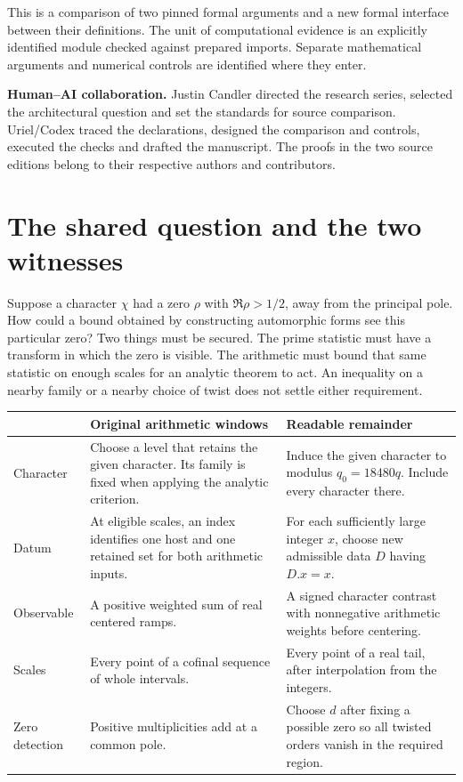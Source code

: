 \documentclass[12pt,letterpaper]{article}
\begin{document}
This is a comparison of two pinned formal arguments and a new formal interface between their definitions. The unit of computational evidence is an explicitly identified module checked against prepared imports. Separate mathematical arguments and numerical controls are identified where they enter.
\medskip

\textbf{Human--AI collaboration.} Justin Candler directed the research series, selected the architectural question and set the standards for source comparison. Uriel/Codex traced the declarations, designed the comparison and controls, executed the checks and drafted the manuscript. The proofs in the two source editions belong to their respective authors and contributors.
\clearpage\begingroup\small\setlength{\parskip}{0pt}\tableofcontents\endgroup
\clearpage{}

\section{The shared question and the two witnesses}
Suppose a character $\chi$ had a zero $\rho$ with $\Re\rho>1/2$, away from the principal pole. How could a bound obtained by constructing automorphic forms see this particular zero? Two things must be secured. The prime statistic must have a transform in which the zero is visible. The arithmetic must bound that same statistic on enough scales for an analytic theorem to act. An inequality on a nearby family or a nearby choice of twist does not settle either requirement.

\begin{center}\small
\begin{tabularx}{\linewidth}{@{}p{.17\linewidth}YY@{}}\toprule
 & Original arithmetic windows & Readable remainder\\\midrule
Character & Choose a level that retains the given character. Its family is fixed when applying the analytic criterion. & Induce the given character to modulus $q_0=18480q$. Include every character there.\\
Datum & At eligible scales, an index identifies one host and one retained set for both arithmetic inputs. & For each sufficiently large integer $x$, choose new admissible data $D$ having $D.x=x$.\\
Observable & A positive weighted sum of real centered ramps. & A signed character contrast with nonnegative arithmetic weights before centering.\\
Scales & Every point of a cofinal sequence of whole intervals. & Every point of a real tail, after interpolation from the integers.\\
Zero detection & Positive multiplicities add at a common pole. & Choose $d$ after fixing a possible zero so all twisted orders vanish in the required region.\\\bottomrule
\end{tabularx}\end{center}
\end{document}
